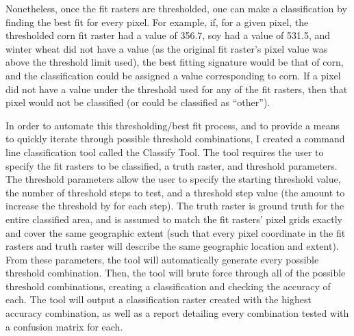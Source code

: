 Nonetheless, once the fit rasters are thresholded, one can make a classification by finding the best fit for every pixel. For example, if, for a given pixel, the thresholded corn fit raster had a value of 356.7, soy had a value of 531.5, and winter wheat did not have a value (as the original fit raster’s pixel value was above the threshold limit used), the best fitting signature would be that of corn, and the classification could be assigned a value corresponding to corn. If a pixel did not have a value under the threshold used for any of the fit rasters, then that pixel would not be classified (or could be classified as “other”).

In order to automate this thresholding/best fit process, and to provide a means to quickly iterate through possible threshold combinations, I created a command line classification tool called the Classify Tool. The tool requires the user to specify the fit rasters to be classified, a truth raster, and threshold parameters. The threshold parameters allow the user to specify the starting threshold value, the number of threshold steps to test, and a threshold step value (the amount to increase the threshold by for each step). The truth raster is ground truth for the entire classified area, and is assumed to match the fit rasters’ pixel grids exactly and cover the same geographic extent (such that every pixel coordinate in the fit rasters and truth raster will describe the same geographic location and extent). From these parameters, the tool will automatically generate every possible threshold combination. Then, the tool will brute force through all of the possible threshold combinations, creating a classification and checking the accuracy of each. The tool will output a classification raster created with the highest accuracy combination, as well as a report detailing every combination tested with a confusion matrix for each.